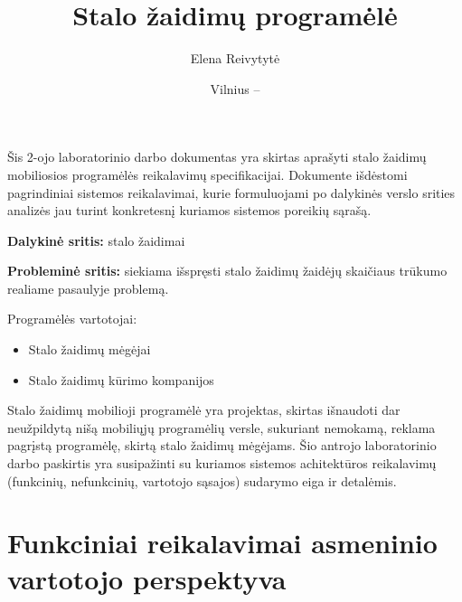 \documentclass{VUMIFPSkursinis}
\title{Stalo žaidimų programėlė}
\author{Elena Reivytytė}
\date{Vilnius – \the\year}
\begin{document}
\maketitle

Šis 2-ojo laboratorinio darbo dokumentas yra skirtas aprašyti stalo žaidimų mobiliosios programėlės reikalavimų specifikacijai. Dokumente išdėstomi pagrindiniai sistemos reikalavimai, kurie formuluojami po dalykinės verslo srities analizės jau turint konkretesnį kuriamos sistemos poreikių sąrašą.

\tableofcontents

\textbf{Dalykinė sritis:} stalo žaidimai

\textbf{Probleminė sritis:} siekiama išspręsti stalo žaidimų žaidėjų skaičiaus trūkumo realiame pasaulyje problemą.

Programėlės vartotojai: 
\begin{itemize}
	\item Stalo žaidimų mėgėjai
	\item Stalo žaidimų kūrimo kompanijos
\end{itemize}

Stalo žaidimų mobilioji programėlė yra projektas, skirtas išnaudoti dar neužpildytą nišą mobiliųjų programėlių versle, sukuriant nemokamą, reklama pagrįstą programėlę, skirtą stalo žaidimų mėgėjams. 
Šio antrojo laboratorinio darbo paskirtis yra susipažinti su kuriamos sistemos achitektūros reikalavimų (funkcinių, nefunkcinių, vartotojo sąsajos) sudarymo eiga ir detalėmis.

\section{Funkciniai reikalavimai asmeninio vartotojo perspektyva}

\newcommand\rownumberfr{\stepcounter{frcount}\arabic{frcount}}
\end{document}
